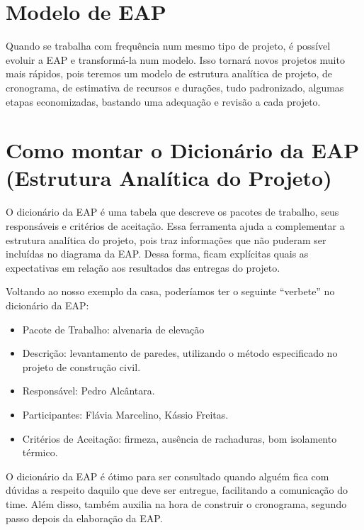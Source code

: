 \section{Modelo de EAP}

Quando se trabalha com frequência num mesmo tipo de projeto, é possível evoluir a EAP e transformá-la num modelo. Isso tornará novos projetos muito mais rápidos, pois teremos um modelo de estrutura analítica de projeto, de cronograma, de estimativa de recursos e durações, tudo padronizado, algumas etapas economizadas, bastando uma adequação e revisão a cada projeto.

\section{Como montar o Dicionário da EAP (Estrutura Analítica do Projeto)}

O dicionário da EAP é uma tabela que descreve os pacotes de trabalho, seus responsáveis e critérios de aceitação. Essa ferramenta ajuda a complementar a estrutura analítica do projeto, pois traz informações que não puderam ser incluídas no diagrama da EAP. Dessa forma, ficam explícitas quais as expectativas em relação aos resultados das entregas do projeto.

Voltando ao nosso exemplo da casa, poderíamos ter o seguinte “verbete” no dicionário da EAP:

\begin{itemize}
\item Pacote de Trabalho: alvenaria de elevação
\item Descrição: levantamento de paredes, utilizando o método especificado no projeto de construção civil.
\item Responsável: Pedro Alcântara.
\item Participantes: Flávia Marcelino, Kássio Freitas.
\item Critérios de Aceitação: firmeza, ausência de rachaduras, bom isolamento térmico.
\end{itemize}

O dicionário da EAP é ótimo para ser consultado quando alguém fica com dúvidas a respeito daquilo que deve ser entregue, facilitando a comunicação do time. Além disso, também auxilia na hora de construir o cronograma, segundo passo depois da elaboração da EAP.
\nocite{eap}
